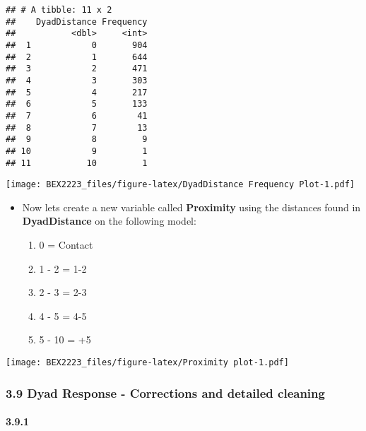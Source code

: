 \documentclass[
]{article}
\providecommand{\tightlist}{%
  \setlength{\itemsep}{0pt}\setlength{\parskip}{0pt}}
\begin{document}
\begin{verbatim}
## # A tibble: 11 x 2
##    DyadDistance Frequency
##           <dbl>     <int>
##  1            0       904
##  2            1       644
##  3            2       471
##  4            3       303
##  5            4       217
##  6            5       133
##  7            6        41
##  8            7        13
##  9            8         9
## 10            9         1
## 11           10         1
\end{verbatim}

\texttt{[image: BEX2223\_files/figure-latex/DyadDistance Frequency Plot-1.pdf]}

\begin{itemize}
\tightlist
\item
  Now lets create a new variable called \textbf{Proximity} using the
  distances found in \textbf{DyadDistance} on the following model:

  \begin{enumerate}
  \def\labelenumi{\alph{enumi}.}
  \tightlist
  \item
    0 = Contact
  \item
    1 - 2 = 1-2
  \item
    2 - 3 = 2-3
  \item
    4 - 5 = 4-5
  \item
    5 - 10 = +5
  \end{enumerate}
\end{itemize}

\texttt{[image: BEX2223\_files/figure-latex/Proximity plot-1.pdf]}

\hypertarget{dyad-response---corrections-and-detailed-cleaning}{%
\subsubsection{3.9 Dyad Response - Corrections and detailed
cleaning}\label{dyad-response---corrections-and-detailed-cleaning}}

\hypertarget{section}{%
\paragraph{3.9.1}\label{section}}
\end{document}
